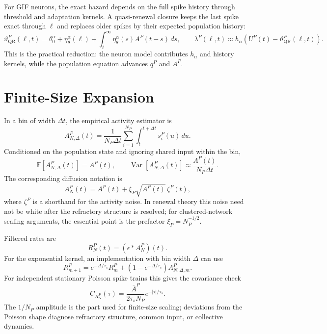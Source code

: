 For GIF neurons, the exact hazard depends on the full spike history through
threshold and adaptation kernels. A quasi-renewal closure keeps the last spike
exact through \(\ell\) and replaces older spikes by their expected population
history:
\begin{equation}
  \vartheta_{\mathrm{QR}}^P(\ell,t)
  =
  \theta_0^\alpha
  + \eta_\theta^\alpha(\ell)
  + \int_\ell^\infty
  \eta_\theta^\alpha(s)A^P(t-s)\,ds,
  \qquad
  \lambda^P(\ell,t)
  \approx
  h_\alpha\!\left(U^P(t)-\vartheta_{\mathrm{QR}}^P(\ell,t)\right).
  \label{eq:appA-quasi-renewal}
\end{equation}
This is the practical reduction: the neuron model contributes \(h_\alpha\) and
history kernels, while the population equation advances \(q^P\) and \(A^P\).

\section{Finite-Size Expansion}

In a bin of width \(\Delta t\), the empirical activity estimator is
\begin{equation}
  A_{N,\Delta}^P(t)
  =
  \frac{1}{N_P\Delta t}
  \sum_{i=1}^{N_P}
  \int_t^{t+\Delta t}s_i^P(u)\,du.
  \label{eq:appA-binned-activity}
\end{equation}
Conditioned on the population state and ignoring shared input within the bin,
\begin{equation}
  \mathbb E[A_{N,\Delta}^P(t)]=A^P(t),
  \qquad
  \operatorname{Var}[A_{N,\Delta}^P(t)]
  \approx
  \frac{A^P(t)}{N_P\Delta t}.
  \label{eq:appA-binned-moments}
\end{equation}
The corresponding diffusion notation is
\begin{equation}
  A_N^P(t)
  =
  A^P(t)
  +
  \xi_P\sqrt{A^P(t)}\,\zeta^P(t),
  \label{eq:appA-finite-size-activity}
\end{equation}
where \(\zeta^P\) is a shorthand for the activity noise. In renewal theory this
noise need not be white after the refractory structure is resolved; for
clustered-network scaling arguments, the essential point is the prefactor
\(\xi_P=N_P^{-1/2}\).

Filtered rates are
\begin{equation}
  R_N^P(t)=(\epsilon*A_N^P)(t).
  \label{eq:appA-filtered-rate}
\end{equation}
For the exponential kernel, an implementation with bin width \(\Delta\) can use
\begin{equation}
  R_{m+1}^P
  =
  e^{-\Delta/\tau_s}R_m^P
  +
  \left(1-e^{-\Delta/\tau_s}\right)A_{N,\Delta,m}^P.
  \label{eq:appA-filter-recursion}
\end{equation}
For independent stationary Poisson spike trains this gives the covariance
check
\begin{equation}
  C_{R_N^P}(\tau)
  =
  \frac{\bar A^P}{2\tau_s N_P}e^{-|\tau|/\tau_s}.
  \label{eq:appA-filtered-covariance}
\end{equation}
The \(1/N_P\) amplitude is the part used for finite-size scaling; deviations
from the Poisson shape diagnose refractory structure, common input, or
collective dynamics.

